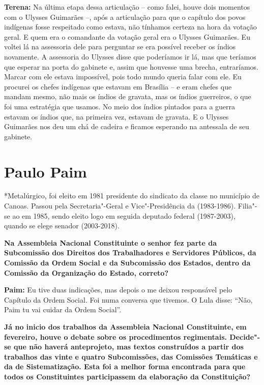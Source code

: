 \textbf{Terena:} Na última etapa dessa articulação -- como falei, houve
dois momentos com o Ulysses Guimarães --, após a articulação para que o
capítulo dos povos indígenas fosse respeitado como estava, não tínhamos
certeza na hora da votação geral. E quem era o comandante da votação
geral era o Ulysses Guimarães. Eu voltei lá na assessoria dele para
perguntar se era possível receber os índios novamente. A assessoria do
Ulysses disse que poderíamos ir lá, mas que teríamos que esperar na
porta do gabinete e, assim que houvesse uma brecha, entraríamos. Marcar
com ele estava impossível, pois todo mundo queria falar com ele. Eu
procurei os chefes indígenas que estavam em Brasília -- e eram chefes
que mandam mesmo, não mais os índios de gravata, mas os índios
guerreiros, o que foi uma estratégia que usamos. No meio dos índios
pintados para a guerra estavam os índios que, na primeira vez, estavam
de gravata. E o Ulysses Guimarães nos deu um chá de cadeira e ficamos
esperando na antessala de seu gabinete.

\chapter{Paulo Paim}

*Metalúrgico, foi eleito em 1981 presidente do sindicato da classe no
município de Canoas. Passou pela Secretaria"-Geral e Vice"-Presidência da
 (1983-1986). Filia"-se ao  em 1985, sendo eleito logo em seguida
deputado federal (1987-2003), quando se elege senador (2003-2018).

\textbf{Na Assembleia Nacional Constituinte o senhor fez parte da
Subcomissão dos Direitos dos Trabalhadores e Servidores Públicos, da
Comissão da Ordem Social e da Subcomissão dos Estados, dentro da
Comissão da Organização do Estado, correto?}

\textbf{Paim:} Eu tive duas indicações, mas depois o  me deixou
responsável pelo Capítulo da Ordem Social. Foi numa conversa que
tivemos. O Lula disse: ``Não, Paim tu vai cuidar da Ordem Social''.

\textbf{Já no inicio dos trabalhos da Assembleia Nacional Constituinte,
em fevereiro, houve o debate sobre os procedimentos regimentais.
Decide"-se que não haverá anteprojeto, mas textos construídos a partir
dos trabalhos das vinte e quatro Subcomissões, das Comissões Temáticas e
da de Sistematização. Esta foi a melhor forma encontrada para que todos
os Constituintes participassem da elaboração da Constituição?}


